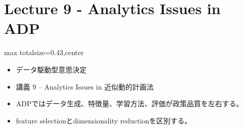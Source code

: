 \section*{Lecture 9 - Analytics Issues in ADP}

\clearpage
{}
\begin{minipage}[t]{0.405\textwidth}
\begin{adjustbox}{max totalsize={\textwidth}{0.43\textheight},center}
\begin{minipage}{\textwidth}\scriptsize
{}\begin{itemize}
\item データ駆動型意思決定
\item 講義 9 – Analytics Issues in 近似動的計画法
\end{itemize}\begin{itemize}
\item ADPではデータ生成、特徴量、学習方法、評価が政策品質を左右する。
\item feature selectionとdimensionality reductionを区別する。
\end{itemize}
\end{minipage}
\end{adjustbox}
\end{minipage}\hfill
